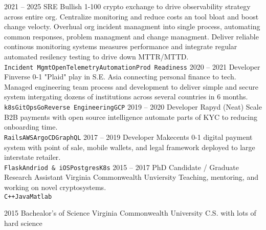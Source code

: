 \documentclass[9pt]{developercv} %
\begin{document}
\begin{entrylist}
	\entry
		{2021 -- 2025}
		{SRE}
		{Bullish}
		{1-100 crypto exchange to drive observability strategy across entire org. Centralize monitoring and reduce costs an tool bloat and boost change velocty. Overhual org incident managment into single process, automating common responses, problem managment and change managment. Deliver reliable continous monitoring systems measures performance and integrate regular automated resilency testing to drive down MTTR/MTTD. \\ \texttt{Incident Mgmt}\slashsep\texttt{OpenTelemetry}\slashsep\texttt{Automation}\slashsep\texttt{Prod Readiness}}
	\entry
		{2020 -- 2021}
		{Developer}
		{Finverse}
		{0-1 "Plaid" play in S.E. Asia connecting personal finance to tech. Managed engineering team process and development to deliver simple and secure system intergating dozens of institutions across several countries in 6 months. \\ \texttt{k8s}\slashsep\texttt{GitOps}\slashsep\texttt{Go}\slashsep\texttt{Reverse Engineering}\slashsep\texttt{GCP}}
	\entry
		{2019 -- 2020}
		{Developer}
		{Rapyd (Neat)}
		{Scale B2B payments with open source intelligence automate parts of KYC to reducing onboarding time. \\ \texttt{Rails}\slashsep\texttt{AWS}\slashsep\texttt{ArgoCD}\slashsep\texttt{GraphQL}}
	\entry
		{2017 -- 2019}
		{Developer}
		{Makecents}
		{0-1 digital payment system with point of sale, mobile wallets, and legal framework deployed to large interstate retailer.\\ \texttt{Flask}\slashsep\texttt{Andriod \& iOS}\slashsep\texttt{Postgres}\slashsep\texttt{K8s}}
	\entry
		{2015 -- 2017}
		{PhD Candidate / Graduate Research Assistant}
		{Virginia Commonwealth Unviersity}
		{Teaching, mentoring, and working on novel cryptosystems.\\ \texttt{C++}\slashsep\texttt{Java}\slashsep\texttt{Matlab}}
\end{entrylist}



\begin{entrylist}
	\entry
		{2015}
		{Bachealor's of Science}
		{Virginia Commonwealth University}
		{C.S. with lots of hard science}
\end{entrylist}
\end{document}
